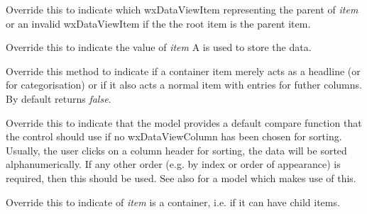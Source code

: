 
Override this to indicate which wxDataViewItem representing the parent
of {\it item} or an invalid wxDataViewItem if the the root item is
the parent item.

\label{wxdataviewmodelgetvalue}


Override this to indicate the value of {\it item}
A  is used to store the data.


\label{wxdataviewmodelhascontainercolumns}


Override this method to indicate if a container item merely
acts as a headline (or for categorisation) or if it also
acts a normal item with entries for futher columns. By 
default returns {\it false}.

\label{wxdataviewmodelhasdefaultcompare}


Override this to indicate that the model provides a default compare
function that the control should use if no wxDataViewColumn has been
chosen for sorting. Usually, the user clicks on a column header for
sorting, the data will be sorted alphanumerically. If any other
order (e.g. by index or order of appearance) is required, then this
should be used. See also 
for a model which makes use of this.

\label{wxdataviewmodeliscontainer}


Override this to indicate of {\it item} is a container, i.e. if
it can have child items.

\label{wxdataviewmodelitemadded}


